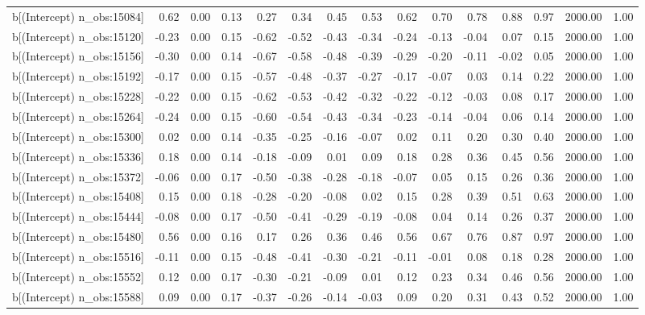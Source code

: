 \begin{table}[ht]
\begin{tabular}{rrrrrrrrrrrrrrr}
  b[(Intercept) n\_obs:15084] & 0.62 & 0.00 & 0.13 & 0.27 & 0.34 & 0.45 & 0.53 & 0.62 & 0.70 & 0.78 & 0.88 & 0.97 & 2000.00 & 1.00 \\ 
  b[(Intercept) n\_obs:15120] & -0.23 & 0.00 & 0.15 & -0.62 & -0.52 & -0.43 & -0.34 & -0.24 & -0.13 & -0.04 & 0.07 & 0.15 & 2000.00 & 1.00 \\ 
  b[(Intercept) n\_obs:15156] & -0.30 & 0.00 & 0.14 & -0.67 & -0.58 & -0.48 & -0.39 & -0.29 & -0.20 & -0.11 & -0.02 & 0.05 & 2000.00 & 1.00 \\ 
  b[(Intercept) n\_obs:15192] & -0.17 & 0.00 & 0.15 & -0.57 & -0.48 & -0.37 & -0.27 & -0.17 & -0.07 & 0.03 & 0.14 & 0.22 & 2000.00 & 1.00 \\ 
  b[(Intercept) n\_obs:15228] & -0.22 & 0.00 & 0.15 & -0.62 & -0.53 & -0.42 & -0.32 & -0.22 & -0.12 & -0.03 & 0.08 & 0.17 & 2000.00 & 1.00 \\ 
  b[(Intercept) n\_obs:15264] & -0.24 & 0.00 & 0.15 & -0.60 & -0.54 & -0.43 & -0.34 & -0.23 & -0.14 & -0.04 & 0.06 & 0.14 & 2000.00 & 1.00 \\ 
  b[(Intercept) n\_obs:15300] & 0.02 & 0.00 & 0.14 & -0.35 & -0.25 & -0.16 & -0.07 & 0.02 & 0.11 & 0.20 & 0.30 & 0.40 & 2000.00 & 1.00 \\ 
  b[(Intercept) n\_obs:15336] & 0.18 & 0.00 & 0.14 & -0.18 & -0.09 & 0.01 & 0.09 & 0.18 & 0.28 & 0.36 & 0.45 & 0.56 & 2000.00 & 1.00 \\ 
  b[(Intercept) n\_obs:15372] & -0.06 & 0.00 & 0.17 & -0.50 & -0.38 & -0.28 & -0.18 & -0.07 & 0.05 & 0.15 & 0.26 & 0.36 & 2000.00 & 1.00 \\ 
  b[(Intercept) n\_obs:15408] & 0.15 & 0.00 & 0.18 & -0.28 & -0.20 & -0.08 & 0.02 & 0.15 & 0.28 & 0.39 & 0.51 & 0.63 & 2000.00 & 1.00 \\ 
  b[(Intercept) n\_obs:15444] & -0.08 & 0.00 & 0.17 & -0.50 & -0.41 & -0.29 & -0.19 & -0.08 & 0.04 & 0.14 & 0.26 & 0.37 & 2000.00 & 1.00 \\ 
  b[(Intercept) n\_obs:15480] & 0.56 & 0.00 & 0.16 & 0.17 & 0.26 & 0.36 & 0.46 & 0.56 & 0.67 & 0.76 & 0.87 & 0.97 & 2000.00 & 1.00 \\ 
  b[(Intercept) n\_obs:15516] & -0.11 & 0.00 & 0.15 & -0.48 & -0.41 & -0.30 & -0.21 & -0.11 & -0.01 & 0.08 & 0.18 & 0.28 & 2000.00 & 1.00 \\ 
  b[(Intercept) n\_obs:15552] & 0.12 & 0.00 & 0.17 & -0.30 & -0.21 & -0.09 & 0.01 & 0.12 & 0.23 & 0.34 & 0.46 & 0.56 & 2000.00 & 1.00 \\ 
  b[(Intercept) n\_obs:15588] & 0.09 & 0.00 & 0.17 & -0.37 & -0.26 & -0.14 & -0.03 & 0.09 & 0.20 & 0.31 & 0.43 & 0.52 & 2000.00 & 1.00 \\ 

\end{tabular}
\end{table}
